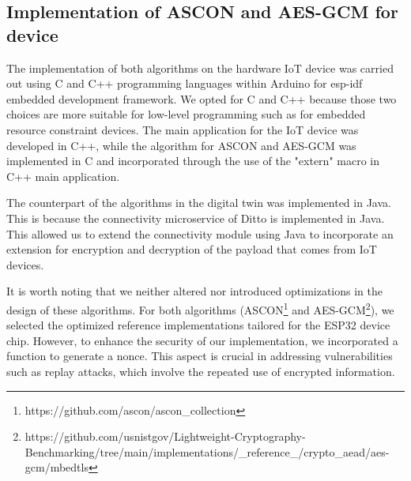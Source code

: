 

\subsection{Implementation of ASCON and AES-GCM for device}





The implementation of both algorithms on the hardware IoT device was carried out using C and C++ programming languages within Arduino for esp-idf embedded development framework. We opted for C and C++ because those two choices are more suitable for low-level programming such as for embedded resource constraint devices. The main application for the IoT device was developed in C++, while the algorithm for ASCON and AES-GCM was implemented in C and incorporated through the use of the "extern" macro in C++ main application.


The counterpart of the algorithms in the digital twin was implemented in Java. This is because the connectivity microservice of Ditto is implemented in Java. This allowed us to extend the connectivity module using Java to incorporate an extension for encryption and decryption of the payload that comes from IoT devices.

It is worth noting that we neither altered nor introduced optimizations in the design of these algorithms. For both algorithms (ASCON\footnote{https://github.com/ascon/ascon\_collection} and AES-GCM\footnote{https://github.com/usnistgov/Lightweight-Cryptography-Benchmarking/tree/main/implementations/\_reference\_/crypto\_aead/aes-gcm/mbedtls}), we selected the optimized reference implementations tailored for the ESP32 device chip. However, to enhance the security of our implementation, we incorporated a function to generate a nonce. This aspect is crucial in addressing vulnerabilities such as replay attacks, which involve the repeated use of encrypted information.

